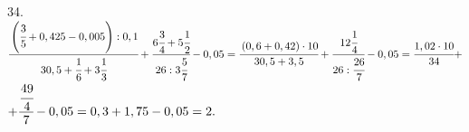 34. $\cfrac{\left(\cfrac{3}{5}+0,425-0,005\right):0,1}{30,5+\cfrac{1}{6}+3\cfrac{1}{3}}+\cfrac{6\cfrac{3}{4}+5\cfrac{1}{2}}
{26:3\cfrac{5}{7}}-0,05=\cfrac{\left(0,6+0,42\right)\cdot10}{30,5+3,5}+\cfrac{12\cfrac{1}{4}}
{26:\cfrac{26}{7}}-0,05=\cfrac{1,02\cdot10}{34}+$\\$+\cfrac{\cfrac{49}{4}}
{7}-0,05=0,3+1,75-0,05=2.$\\
